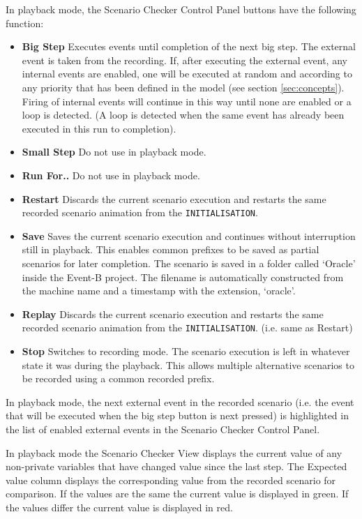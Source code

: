 In playback mode, the Scenario Checker Control Panel buttons have the following function:
\begin{itemize}
	\item \textbf{Big Step}  Executes events until completion of the next big step. The external event is taken from the recording. If, after executing the external event, any internal events are enabled, one will be executed at random and according to any priority that has been defined in the model (see section \ref{sec:concepts}). Firing of internal events will continue in this way until none are enabled or a loop is detected. (A loop is detected when the same event has already been executed in this run to completion).
	\item \textbf{Small Step}  Do not use in playback mode.
	\item \textbf{Run For..}   Do not use in playback mode.
	\item \textbf{Restart}  Discards the current scenario execution and restarts the same recorded scenario animation from the \texttt{INITIALISATION}. 
	\item \textbf{Save}  Saves the current scenario execution and continues without interruption still in playback. This enables common prefixes to be saved as partial scenarios for later completion. The scenario is saved in a folder called `Oracle' inside the Event-B project. The filename is automatically constructed from the machine name and a timestamp with the extension, `oracle'. 
	\item \textbf{Replay}  Discards the current scenario execution and restarts the same recorded scenario animation from the \texttt{INITIALISATION}. (i.e. same as Restart)
	\item \textbf{Stop}  Switches to recording mode. The scenario execution is left in whatever state it was during the playback. This allows multiple alternative scenarios to be recorded using a common recorded prefix.
\end{itemize}

In playback mode, the next external event in the recorded scenario (i.e. the event that will be executed when the big step button is next pressed) is highlighted in the list of enabled external events in the Scenario Checker Control Panel.

In playback mode the Scenario Checker View displays the current value of any non-private variables that have changed value since the last step.
The Expected value column displays the corresponding value from the recorded scenario for comparison.
If the values are the same the current value is displayed in green. 
If the values differ the current value is displayed in red.

